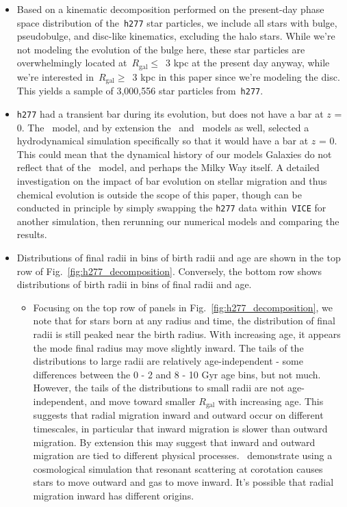 \documentclass[fleqn, usenatbib]{mnras}
\begin{document}
\begin{itemize}
	\item Based on a kinematic decomposition performed on the present-day 
	phase space distribution of the~\texttt{h277} star particles, we include 
	all stars with bulge, pseudobulge, and disc-like kinematics, excluding the 
	halo stars. While we're not modeling the evolution of the bulge here, these 
	star particles are overwhelmingly located at~$R_\text{gal} \leq$~3 kpc at 
	the present day anyway, while we're interested in~$R_\text{gal} \geq$~3 kpc 
	in this paper since we're modeling the disc. This yields a sample of 
	3,000,556 star particles from~\texttt{h277}. 

	\item \texttt{h277} had a transient bar during its evolution, but does 
	not have a bar at $z$ = 0. The~\citet{Minchev2013} model, and by extension 
	the~\citet{Minchev2014} and~\citet{Minchev2017} models as well, selected a 
	hydrodynamical simulation specifically so that it would have a bar at 
	$z$ = 0. This could mean that the dynamical history of our models Galaxies 
	do not reflect that of the~\citet{Minchev2013} model, and perhaps the 
	Milky Way itself. A detailed investigation on the impact of bar evolution 
	on stellar migration and thus chemical evolution is outside the scope of 
	this paper, though can be conducted in principle by simply swapping the 
	\texttt{h277} data within~\texttt{VICE} for another simulation, then 
	rerunning our numerical models and comparing the results. 

	\item Distributions of final radii in bins of birth radii and age are 
	shown in the top row of Fig.~\ref{fig:h277_decomposition}. Conversely, the 
	bottom row shows distributions of birth radii in bins of final radii and 
	age. 
	\begin{itemize} 
		\item Focusing on the top row of panels in 
		Fig.~\ref{fig:h277_decomposition}, we note that for stars born at any 
		radius and time, the distribution of final radii is still peaked near 
		the birth radius. With increasing age, it appears the mode final radius 
		may move slightly inward. The tails of the distributions to large radii 
		are relatively age-independent - some differences between the 0 - 2 and 
		8 - 10 Gyr age bins, but not much. However, the tails of the 
		distributions to small radii are not age-independent, and move toward 
		smaller $R_\text{gal}$ with increasing age. This suggests that radial 
		migration inward and outward occur on different timescales, in 
		particular that inward migration is slower than 
		outward migration. By extension this may suggest that inward and 
		outward migration are tied to different physical 
		processes.~\citet{Roskar2008a} demonstrate using a cosmological 
		simulation that resonant scattering at corotation causes stars to 
		move outward and gas to move inward. It's possible that radial 
		migration inward has different origins. 


\end{itemize}
\end{itemize}
\end{document}
